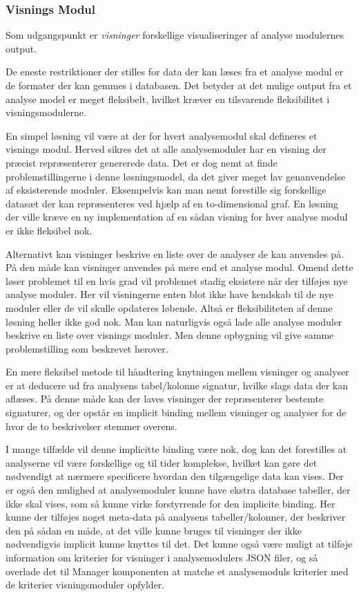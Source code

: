 \subsubsection{Visnings Modul}\label{sec:visningsmodul}

Som udgangspunkt er \textit{visninger} forskellige visualiseringer af analyse modulernes output.

De eneste restriktioner der stilles for data der kan læses fra et analyse modul er de formater der kan gemmes i databasen.
Det betyder at det mulige output fra et analyse model er meget fleksibelt, hvilket kræver en tilsvarende fleksibilitet i visningsmodulerne.

En simpel løsning vil være at der for hvert analysemodul skal defineres et visnings modul.
Herved sikres det at alle analysemoduler har en visning der præcist repræsenterer genererede data.
Det er dog nemt at finde problemstillingerne i denne løsningsmodel, da det giver meget lav genanvendelse af eksisterende moduler.
Eksempelvis kan man nemt forestille sig forskellige datasæt der kan repræsenteres ved hjælp af en to-dimensional graf.
En løsning der ville kræve en ny implementation af en sådan visning for hver analyse modul er ikke fleksibel nok.

Alternativt kan visninger beskrive en liste over de analyser de kan anvendes på.
På den måde kan visninger anvendes på mere end et analyse modul.
Omend dette løser problemet til en hvis grad vil problemet stadig eksistere når der tilføjes nye analyse moduler.
Her vil visningerne enten blot ikke have kendskab til de nye moduler eller de vil skulle opdateres løbende.
Altså er fleksibiliteten af denne løsning heller ikke god nok.
Man kan naturligvis også lade alle analyse moduler beskrive en liste over visnings moduler.
Men denne opbygning vil give samme problemstilling som beskrevet herover.

En mere fleksibel metode til håndtering knytningen mellem visninger og analyser er at deducere ud fra analysens tabel/kolonne signatur, hvilke slags data der kan aflæses.
På denne måde kan der laves visninger der repræsenterer bestemte signaturer, og der opstår en implicit binding mellem visninger og analyser for de hvor de to beskrivelser stemmer overens.

I mange tilfælde vil denne implicitte binding være nok, dog kan det forestilles at analyserne vil være forskellige og til tider komplekse, hvilket kan gøre det nødvendigt at nærmere specificere hvordan den tilgængelige data kan vises.
Der er også den mulighed at analysemoduler kunne have ekstra database tabeller, der ikke skal vises, som så kunne virke forstyrrende for den implicite binding.
Her kunne der tilføjes noget meta-data på analysens tabeller/kolonner, der beskriver den på sådan en måde, at det ville kunne bruges til visninger der ikke nødvendigvis implicit kunne knyttes til det.
Det kunne også være muligt at tilføje information om kriterier for visninger i analysemodulers JSON filer, og så overlade det til Manager komponenten at matche et analysemoduls kriterier med de kriterier visningsmoduler opfylder.


